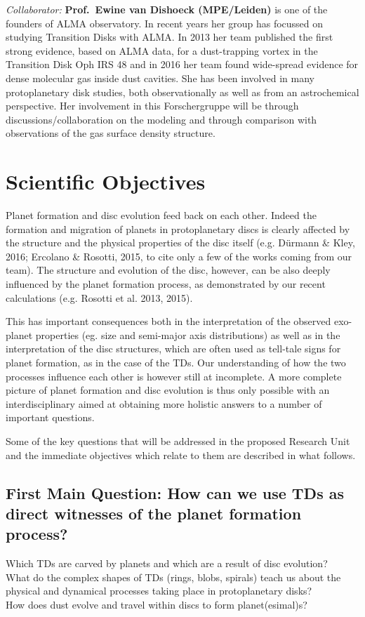 \documentclass[10pt,fleqn,twoside]{article}
\begin{document}
{\it Collaborator:} {\bf Prof.\ Ewine van Dishoeck (MPE/Leiden)}
is one of the founders of ALMA observatory. In recent years her group
has focussed on studying Transition Disks with ALMA. In 2013 her team
published the first strong evidence, based on ALMA data, for a
dust-trapping vortex in the Transition Disk Oph IRS 48 and in 2016 her team found wide-spread
 evidence for dense molecular gas inside dust cavities. She has been
involved in many protoplanetary disk studies, both observationally as
well as from an astrochemical perspective. Her involvement in this Forschergruppe
will be through discussions/collaboration on the modeling and through comparison with
 observations of the gas surface density structure.\\


\section{Scientific Objectives}

Planet formation and disc evolution feed back on each other. Indeed
the formation and migration of planets in protoplanetary discs is
clearly affected by the structure and the physical properties of the
disc itself (e.g. D\"urmann \& Kley, 2016; Ercolano \&
  Rosotti, 2015, to cite only a few of the works coming from our team). The
structure and evolution of the disc, however, can be also deeply
influenced by the planet formation process, as demonstrated by our
recent calculations (e.g. Rosotti et al. 2013, 2015). 

This has important consequences both in the interpretation of the observed
exo-planet properties (eg. size and semi-major axis distributions) as
well as in the interpretation of the disc structures, which are often
used as tell-tale signs for planet formation, as in the case of the
TDs. Our understanding of how the two processes
influence each other is however still at incomplete. A  more
complete picture of planet formation and disc evolution is thus only
possible with an interdisciplinary aimed at obtaining more holistic answers to
a number of important questions. 

Some of the key questions that will be addressed in the proposed
Research Unit and the immediate objectives which relate to them are
described in what follows. 

\subsection{First Main Question: How can we use TDs as direct witnesses of the planet
  formation process?}
Which TDs are carved by planets and which are a result of disc evolution? \\ What do the complex shapes of TDs (rings, blobs, spirals) teach us about the physical and
dynamical processes taking place in protoplanetary disks?\\ How does
dust evolve and travel within discs to form planet(esimal)s?
\end{document}
